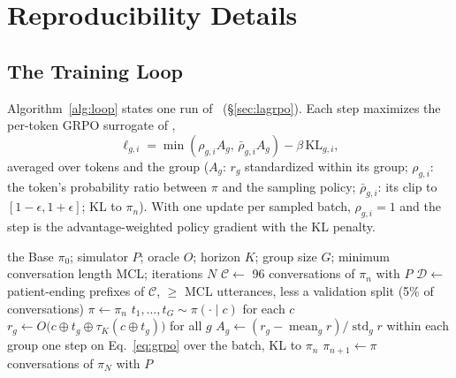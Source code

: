 \section{Reproducibility Details}
\label{app:repro}

\subsection{The Training Loop}

Algorithm~\ref{alg:loop} states one run of \LAGRPO\ (\S\ref{sec:lagrpo}).
Each step maximizes the per-token GRPO surrogate of \citet{shao2024deepseekmath},
\begin{equation}
\label{eq:grpo}
\ell_{g,i} = \min(\rho_{g,i} A_g,\,\bar{\rho}_{g,i} A_g) - \beta\,\mathrm{KL}_{g,i},
\end{equation}
averaged over tokens and the group ($A_g$: $r_g$ standardized within its group; $\rho_{g,i}$: the
token's probability ratio between $\pi$ and
the sampling policy; $\bar{\rho}_{g,i}$: its clip to $[1{-}\epsilon, 1{+}\epsilon]$; KL to $\pi_n$).
With one update per sampled batch, $\rho_{g,i}{=}1$ and the step is the advantage-weighted policy
gradient with the KL penalty.

\begin{algorithm}[h]
\caption{\LAGRPO\ (one run)}
\label{alg:loop}
\small
\begin{algorithmic}[1]
\REQUIRE the Base $\pi_0$; simulator $P$; oracle $O$; horizon $K$; group size $G$; minimum
  conversation length MCL; iterations $N$
  \STATE $\mathcal{C} \gets$ 96 conversations of $\pi_n$ with $P$ 
  \STATE $\mathcal{D} \gets$ patient-ending prefixes of $\mathcal{C}$, $\geq$ MCL utterances, less a
    validation split (5\% of conversations)
  \STATE $\pi \gets \pi_n$
    \STATE $t_1, \dots, t_G \sim \pi(\cdot \mid c)$ for each $c$
    \STATE $r_g \gets O\big(c \oplus t_g \oplus \tau_K(c \oplus t_g)\big)$ for all $g$
    \STATE $A_g \gets (r_g - \operatorname{mean}_g r)/\operatorname{std}_g r$ within each group
    \STATE one step on Eq.~\ref{eq:grpo} over the batch, KL to $\pi_n$
  \ENDFOR
  \STATE $\pi_{n+1} \gets \pi$
\ENDFOR
{} conversations of $\pi_N$ with $P$ 
\end{algorithmic}
\end{algorithm}

